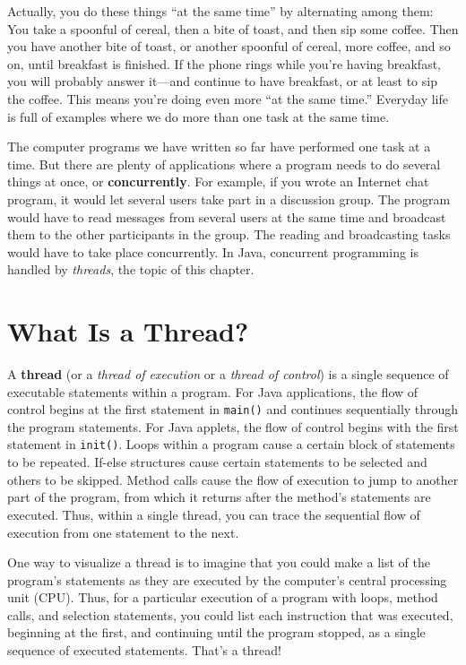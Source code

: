 Actually, you do these things ``at the same time'' by alternating
among them: You take a spoonful of cereal, then a bite of toast, and
then sip some coffee.  Then you have another bite of toast, or another
spoonful of cereal, more coffee, and so on, until breakfast is
finished.  If the phone rings while you're having breakfast, you will
probably answer it---and continue to have breakfast, or at least to
sip the coffee.  This means you're doing even more ``at the same
time.''  Everyday life is full of examples where we do more than one
task at the same time.

The computer programs we have written so far have performed one task
at a time.  But there are plenty of applications where a program needs
to do several things at once, or {\bf
concurrently}.  For example, if you wrote an
Internet chat program, it would let several users take part in a
discussion group.  The program would have to read messages from
several users at the same time and broadcast them to the other
participants in the group.  The reading and broadcasting tasks would
have to take place concurrently. In Java, concurrent programming is
handled by {\it threads}, the topic of this chapter.

\section{What Is a Thread?}
\label{what-isa-thread}
\noindent A {\bf thread} (or a {\it thread of execution} or a {\it thread of
control}) is a single sequence of executable statements within a
program.  For Java applications, the flow of control begins at the
first statement in {\tt main()} and continues sequentially through the
program statements.  For Java applets, the flow of control
begins with the first statement in {\tt init()}.  Loops within a
program cause a certain block of statements to be repeated.  If-else
structures cause certain statements to be selected and others to be
skipped.  Method calls cause the flow of execution to jump to another
part of the program, from which it returns after the method's
statements are executed.   Thus, within a single thread, you can trace
the sequential flow of execution from one statement to the next.

One way to visualize a thread is to imagine that you could make a
list of the program's statements as they are executed by the
computer's central processing unit (CPU).  Thus, for a particular
execution of a program with loops, method calls, and selection
statements, you could list each instruction that was executed,
beginning at the first, and continuing until the program stopped, as a
single sequence of executed statements.  That's a thread!


